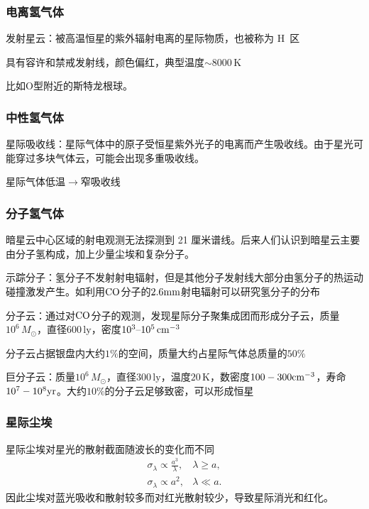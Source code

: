 \documentclass[../天体物理基础.tex]{subfiles}
\begin{document}
\subsubsection{电离氢气体}

发射星云：被高温恒星的紫外辐射电离的星际物质，也被称为 H\,\uppercase\expandafter{} 区

具有容许和禁戒发射线，颜色偏红，典型温度$\sim8000\,\mathrm{K}$

比如$\mathrm{O}$型附近的斯特龙根球。

\subsubsection{中性氢气体}

星际吸收线：星际气体中的原子受恒星紫外光子的电离而产生吸收线。由于星光可能穿过多块气体云，可能会出现多重吸收线。

星际气体低温$\to$窄吸收线

\subsubsection{分子氢气体}

暗星云中心区域的射电观测无法探测到 21 厘米谱线。后来人们认识到暗星云主要由分子氢构成，加上少量尘埃和复杂分子。

示踪分子：氢分子不发射射电辐射，但是其他分子发射线大部分由氢分子的热运动碰撞激发产生。如利用$\rm CO$分子的$\rm 2.6mm$射电辐射可以研究氢分子的分布

分子云：通过对$\rm CO$分子的观测，发现星际分子聚集成团而形成分子云，质量$10^{6}\,M_{\odot}$，直径$600\,\mathrm{ly}$，密度$10^{3}\text{\textendash}10^{5}\,\mathrm{cm^{-3}}$

分子云占据银盘内大约$1\%$的空间，质量大约占星际气体总质量的$50\%$

巨分子云：质量$10^{6}\,M_{\odot}$，直径$300\,\mathrm{ly}$，温度$20\,\mathrm{K}$，数密度$100-300\rm cm^{-3}$，寿命$10^7-10^8\rm yr$。大约$10\%$的分子云足够致密，可以形成恒星

\subsubsection{星际尘埃}

星际尘埃对星光的散射截面随波长的变化而不同
\begin{align}
\sigma_{\lambda}\propto{}\frac{a^{3}}{\lambda},&\lambda\ge a,\\
\sigma_{\lambda}\propto{}a^{2},&\lambda\ll a.
\end{align}
因此尘埃对蓝光吸收和散射较多而对红光散射较少，导致星际消光和红化。
\end{document}
